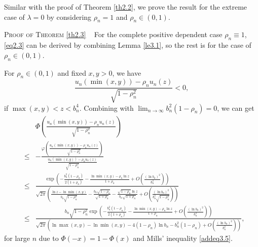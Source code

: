 \documentclass[10pt,twosided]{article}
\numberwithin{equation}{section}
\numberwithin{equation}{section}
\newcommand{\prooftheo}[1]{ \textsc{Proof of Theorem} \ref{#1} }
\begin{document}
Similar with the proof of Theorem \ref{th2.2}, we prove the result for the extreme case of $\lambda=0$ by considering $\rho_n=1$ and $\rho_n\in (0,1)$.

\prooftheo{th2.3}~ For the complete positive dependent case $\rho_n\equiv1$,
\eqref{eq2.3} can be derived by combining Lemma \ref{le3.1}, so the rest is for the case of $\rho_n \in (0,1)$.

For $\rho_n \in (0,1)$ and fixed $x,y>0$, we have
$$\frac{u_n(\min(x,y))-\rho_nu_n(z)}{\sqrt{1-\rho_n^2}}<0,$$
if $\max(x,y)<z< b_n^{4}$.
Combining with $\lim_{n\to \infty} b_n^2(1-\rho_n)=0$, we can get
\begin{eqnarray}\label{eq3.13}
& & \Phi\left(\frac{u_n(\min(x,y))-\rho_nu_n(z)}{\sqrt{1-\rho_n^2}}\right)\nonumber\\
&\le&-\frac{\varphi\left(\frac{u_n(\min(x,y))-\rho_nu_n(z)}{\sqrt{1-\rho_n^2}}\right)}
{\frac{u_n(\min(x,y))-\rho_nu_n(z)}{\sqrt{1-\rho_n^2}}}\nonumber\\
&\le&\frac{\exp\left(-\frac{b_n^2(1-\rho_n)}{2(1+\rho_n)} -\frac{\ln \min(x,y)-\rho_n\ln z}{1+\rho_n} +O\left( \frac{(\ln b_{n})^2}{b_{n}^2} \right) \right)}
{\sqrt{2\pi}\left(\frac{\ln z-\ln \min(x,y)}{b_n\sqrt{1-\rho_n^2}}-\frac{b_n\sqrt{1-\rho_n}}{\sqrt{1+\rho_n}}
-\frac{\sqrt{1-\rho_n}\ln z}{b_n \sqrt{1+\rho_n}} + O\left( \frac{(\ln b_{n})^2}{b_{n}^3\sqrt{1-\rho_{n}^2}}  \right)\right)}\nonumber\\
&\le& \frac{b_{n}\sqrt{1-\rho_{n}^2}\exp\left(-\frac{b_n^2(1-\rho_n)}{2(1+\rho_n)} -\frac{\ln \min(x,y)-\rho_n\ln z}{1+\rho_n} +O\left( \frac{(\ln b_{n})^2}{b_{n}^2} \right) \right)}
{\sqrt{2\pi}\left(  \ln \max(x,y)-\ln \min(x,y) - 4(1-\rho_{n})\ln b_{n}
-b_{n}^2(1-\rho_{n}) + O\left( \frac{(\ln b_{n})^2}{b_{n}^2}  \right)\right)},
\end{eqnarray}
for large $n$ due to $\Phi(-x)=1-\Phi(x)$ and Mills' inequality \eqref{addeq3.5}.
\end{document}
